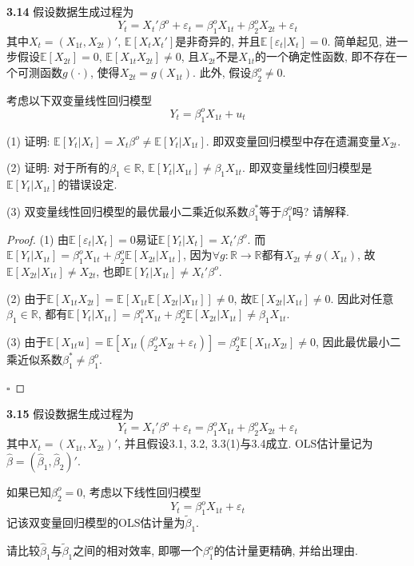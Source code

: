 \documentclass[cn,12pt,math=mtpro2,citestyle=gb7714-2015,bibstyle=gb7714-2015,twocol,mode=simple]{elegantbook}
\newcommand{\E}{\mathbb{E}}
\newcommand{\hbeta}{\hat{\beta}}
\newcommand{\tbeta}{\tilde{\beta}}
\begin{document}
\textbf{3.14} 假设数据生成过程为
$$Y_t=X_t'\beta^o+\varepsilon_t=\beta_1^oX_{1t}+\beta_2^oX_{2t}+\varepsilon_t$$
其中$X_t=(X_{1t},X_{2t})'$, $\E[X_tX_t']$是非奇异的, 并且$\E[\varepsilon_t|X_t]=0$. 简单起见, 进一步假设$\E[X_{2t}]=0$, $\E[X_{1t}X_{2t}]\neq 0$, 且$X_{2t}$不是$X_{1t}$的一个确定性函数, 即不存在一个可测函数$g(\cdot)$, 使得$X_{2t}=g(X_{1t})$. 此外, 假设$\beta_2^o\neq 0$.

考虑以下双变量线性回归模型
$$Y_t=\beta_1^oX_{1t}+u_t$$

(1) 证明: $\E[Y_t|X_t]=X_t\beta^o\neq\E[Y_t|X_{1t}]$. 即双变量回归模型中存在遗漏变量$X_{2t}$.

(2) 证明: 对于所有的$\beta_1\in\mathbb{R}$, $\E[Y_t|X_{1t}]\neq\beta_1X_{1t}$. 即双变量线性回归模型是$\E[Y_t|X_{1t}]$的错误设定.

(3) 双变量线性回归模型的最优最小二乘近似系数$\beta^{\ast}_1$等于$\beta_1^o$吗? 请解释.

\begin{proof}
  (1) 由$\E[\varepsilon_t|X_t]=0$易证$\E[Y_t|X_t]=X_t'\beta^o$. 而$\E[Y_t|X_{1t}]=\beta_1^oX_{1t}+\beta_2^o\E[X_{2t}|X_{1t}]$, 因为$\forall g: \mathbb{R}\rightarrow\mathbb{R}$都有$X_{2t}\neq g(X_{1t})$, 故$\E[X_{2t}|X_{1t}]\neq X_{2t}$, 也即$\E[Y_t|X_{1t}]\neq X_t'\beta^o$.

  (2) 由于$\E[X_{1t}X_{2t}]=\E[X_{1t}\E[X_{2t}|X_{1t}]]\neq 0$, 故$\E[X_{2t}|X_{1t}]\neq 0$. 因此对任意$\beta_1 \in\mathbb{R}$, 都有$\E[Y_t|X_{1t}]=\beta_1^oX_{1t}+\beta_2^o\E[X_{2t}|X_{1t}]\neq \beta_1X_{1t}$.

  (3) 由于$\E[X_{1t}u]=\E[X_{1t}(\beta_2^oX_{2t}+\varepsilon_t)]=\beta_2^o\E[X_{1t}X_{2t}]\neq 0$, 因此最优最小二乘近似系数$\beta^{\ast}_1\neq \beta_1^o$.

  $\square$
\end{proof}

\textbf{3.15} 假设数据生成过程为
$$Y_t=X_t'\beta^o+\varepsilon_t=\beta_1^oX_{1t}+\beta_2^oX_{2t}+\varepsilon_t$$
其中$X_{t}=(X_{1t},X_{2t})'$, 并且假设3.1, 3.2, 3.3(1)与3.4成立. OLS估计量记为$\hbeta=(\hbeta_1,\hbeta_2)'$.

如果已知$\beta_2^o=0$, 考虑以下线性回归模型
$$Y_t=\beta_1^oX_{1t}+\varepsilon_t$$
记该双变量回归模型的OLS估计量为$\tbeta_1$.

请比较$\hbeta_1$与$\tbeta_1$之间的相对效率, 即哪一个$\beta_1^o$的估计量更精确, 并给出理由.
\end{document}
